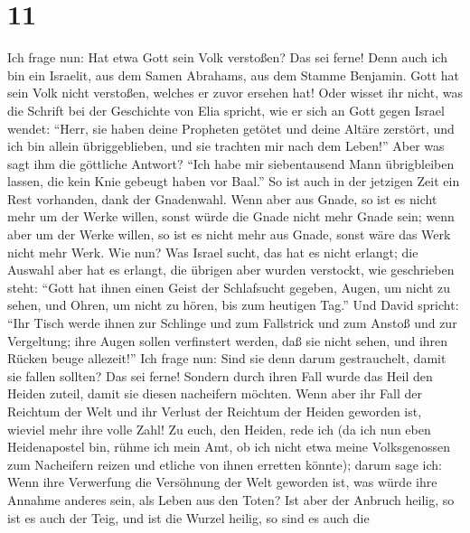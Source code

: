 \hypertarget{section-10}{%
\section{11}\label{section-10}}

 Ich frage nun: Hat etwa Gott sein Volk verstoßen? Das sei
ferne! Denn auch ich bin ein Israelit, aus dem Samen Abrahams, aus dem
Stamme Benjamin.  Gott hat sein Volk nicht verstoßen,
welches er zuvor ersehen hat! Oder wisset ihr nicht, was die Schrift bei
der Geschichte von Elia spricht, wie er sich an Gott gegen Israel
wendet:  ``Herr, sie haben deine Propheten getötet und
deine Altäre zerstört, und ich bin allein übriggeblieben, und sie
trachten mir nach dem Leben!''  Aber was sagt ihm die
göttliche Antwort? ``Ich habe mir siebentausend Mann übrigbleiben
lassen, die kein Knie gebeugt haben vor Baal.''  So ist
auch in der jetzigen Zeit ein Rest vorhanden, dank der Gnadenwahl.
 Wenn aber aus Gnade, so ist es nicht mehr um der Werke
willen, sonst würde die Gnade nicht mehr Gnade sein; wenn aber um der
Werke willen, so ist es nicht mehr aus Gnade, sonst wäre das Werk nicht
mehr Werk.  Wie nun? Was Israel sucht, das hat es nicht
erlangt; die Auswahl aber hat es erlangt, die übrigen aber wurden
verstockt,  wie geschrieben steht: ``Gott hat ihnen einen
Geist der Schlafsucht gegeben, Augen, um nicht zu sehen, und Ohren, um
nicht zu hören, bis zum heutigen Tag.''  Und David
spricht: ``Ihr Tisch werde ihnen zur Schlinge und zum Fallstrick und zum
Anstoß und zur Vergeltung;  ihre Augen sollen verfinstert
werden, daß sie nicht sehen, und ihren Rücken beuge allezeit!''
 Ich frage nun: Sind sie denn darum gestrauchelt, damit
sie fallen sollten? Das sei ferne! Sondern durch ihren Fall wurde das
Heil den Heiden zuteil, damit sie diesen nacheifern möchten.
 Wenn aber ihr Fall der Reichtum der Welt und ihr Verlust
der Reichtum der Heiden geworden ist, wieviel mehr ihre volle Zahl!
 Zu euch, den Heiden, rede ich (da ich nun eben
Heidenapostel bin, rühme ich mein Amt,  ob ich nicht etwa
meine Volksgenossen zum Nacheifern reizen und etliche von ihnen erretten
könnte);  darum sage ich: Wenn ihre Verwerfung die
Versöhnung der Welt geworden ist, was würde ihre Annahme anderes sein,
als Leben aus den Toten?  Ist aber der Anbruch heilig, so
ist es auch der Teig, und ist die Wurzel heilig, so sind es auch die

